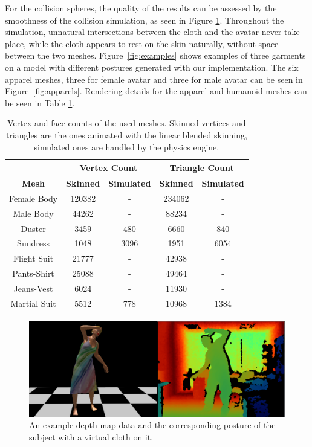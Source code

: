 \documentclass[number,preprint,review,12pt]{elsarticle}
\begin{document}
\doublespacing

For the collision spheres, the quality of the results can be assessed by the smoothness of the collision simulation, as seen in Figure \ref{fig:system}. Throughout the simulation, unnatural intersections between the cloth and the avatar never take place, while the cloth appears to rest on the skin naturally, without space between the two meshes. Figure~\ref{fig:examples} shows examples of three garments on a model with different postures generated with our implementation. The six apparel meshes, three for female avatar and three for male avatar can be seen in Figure~\ref{fig:apparels}. {\color{red}Rendering details for the apparel and humanoid meshes can be seen in Table \ref{tbl:mesh_details}.}


\begin{table}
\begin{center}
{\color{red}
\begin{tabular}{|c|c|c|c|c|}
\hline
 &  \multicolumn{2}{c|}{\textbf{Vertex Count}} &  \multicolumn{2}{c|}{\textbf{Triangle Count}} \\ \hline
 \textbf{Mesh}  & \textbf{Skinned} & \textbf{Simulated} & \textbf{Skinned} & \textbf{Simulated}  \\ \hline
 Female Body & 120382 & - & 234062 & - \\ \hline
 Male Body & 44262 & - & 88234 & - \\ \hline
 Duster & 3459 & 480 & 6660 & 840 \\ \hline
 Sundress & 1048 & 3096 & 1951 & 6054 \\ \hline
 Flight Suit & 21777 & - & 42938 & - \\ \hline
 Pants-Shirt & 25088 & - & 49464 & - \\ \hline
 Jeans-Vest & 6024 & - & 11930 & - \\ \hline
 Martial Suit & 5512 & 778 & 10968 & 1384 \\ \hline
\end{tabular}
}
\end{center}
{\color{red}\caption{Vertex and face counts of the used meshes. Skinned vertices and triangles are the ones animated with the linear blended skinning, simulated ones are handled by the physics engine.}}
\label{tbl:mesh_details}
\end{table} 

\begin{figure}[htbp]
	\begin{center} 
			\includegraphics[width=1.00\textwidth]{scshot.eps}
	\end{center}
	\caption{An example depth map data and the corresponding posture of the subject with a virtual cloth on it.}
	\label{fig:system}
\end{figure}
 
\end{document}
